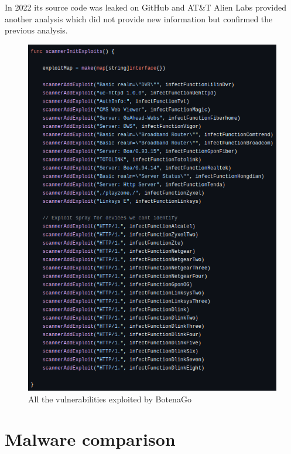 In 2022 its source code was leaked on GitHub and AT\&T Alien Labs provided another analysis which did not provide new information but confirmed the previous analysis. \cite{att-botenago-reverse,att-botenago-sourcecode}

\begin{figure}[ht]
    \centering
    \includegraphics[scale=0.5]{resources/images/all-vulnerabilities-botenago.png}
    \caption{All the vulnerabilities exploited by BotenaGo}
    \label{fig:all-vulnerabilities-botenago}
\end{figure}

\section{Malware comparison}


